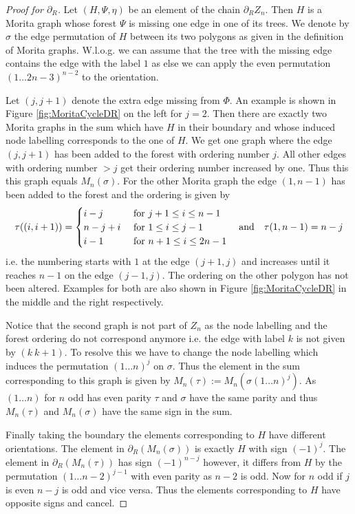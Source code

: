 \begin{proof}[Proof for $\partial_{R}$]
	Let $(H,\Psi,\eta)$ be an element of the chain $\partial_{R} Z_{n}$.
	Then $H$ is a Morita graph whose forest $\Psi$ is missing one edge in one of its trees.
	We denote by $\sigma$ the edge permutation of $H$ between its two polygons as given in the definition of Morita graphs.
	W.l.o.g. we can assume that the tree with the missing edge contains the 
	edge with the label $1$ as else we can apply the even permutation $(1 \ldots 2n-3)^{n-2}$ to the orientation.
	
	Let $(j,j+1)$ denote the extra edge missing from  $\Phi$. An example is shown in Figure \ref{fig:MoritaCycleDR} on the left for $j = 2$.
	Then there are exactly two Morita graphs in the sum which have $H$ in their boundary and whose induced node labelling corresponds to the one of $H$.
	We get one graph where the edge $(j,j+1)$ has been added to the forest with ordering number $j$. 
	All other edges with ordering number $> j$ get their ordering number increased by one. Thus this this graph equals $M_{n}(\sigma)$.
	For the other Morita graph the edge $(1,n-1)$ has been added to the forest and the ordering is given by
	\[
		\tau((i,i+1)) = \begin{cases}
			i-j & \text{ for } j+1 \leq i \leq n-1\\
			n-j+i & \text{ for } 1 \leq i \leq j-1\\
			i-1 & \text{ for } n+1 \leq i \leq 2n-1
		\end{cases} \qq{and} \tau(1,n-1) = n-j
	\] 
	i.e. the numbering starts with $1$ at the edge $(j+1,j)$ and increases until it reaches $n-1$ on the edge  $(j-1,j)$. 
	The ordering on the other polygon has not been altered.
	Examples for both are also shown in Figure \ref{fig:MoritaCycleDR} in the middle and the right respectively.
	
	Notice that the second graph is not part of $Z_{n}$ as the node labelling and the forest ordering do not correspond anymore
	i.e. the edge with label $k$ is not given by  $(k\ k+1)$.
	To resolve this we have to change the node labelling which induces the permutation $(1 \ldots n)^{j}$ on $\sigma$.
	Thus the element in the sum corresponding to this graph is given by  $M_{n}(\tau) := M_{n}(\sigma (1 \ldots n)^{j})$.
	As $(1 \ldots n)$ for $n$ odd has even parity $\tau$ and $\sigma$ have the same parity and thus $M_{n}(\tau)$ and $M_{n}(\sigma)$ have the same sign
	in the sum. 
	
	Finally taking the boundary the elements corresponding to $H$ have different orientations.
	The element in $\partial_{R}(M_{n}(\sigma))$ is exactly $H$ with sign $(-1)^{j}$. The element in $\partial_{R}(M_{n}(\tau))$ has sign $(-1)^{n-j}$ however, it 
	differs from $H$ by the permutation $(1 \ldots n-2)^{j - 1}$ with even parity as $n-2$ is odd.
	Now for $n$ odd if $j$ is even $n-j$ is odd and vice versa. Thus the elements corresponding to $H$ have opposite signs and cancel.


\end{proof}

